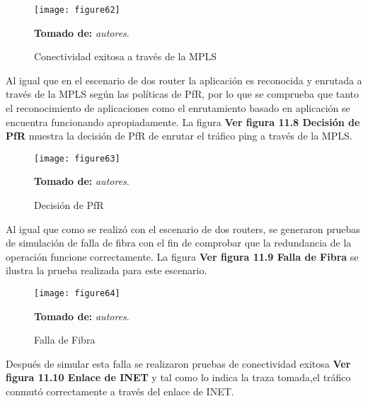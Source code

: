 \begin{figure}[htbp]
  \centering
    {\texttt{[image: figure62]}}%
  \caption{\footnotesize{Conectividad exitosa a través de la MPLS}}
 \footnotesize{ \textbf{Tomado de:} \textit{autores}.}
  \label{fig:fig2subfig}
\end{figure}

Al igual que en el escenario de dos router la aplicación es reconocida y enrutada a través de la MPLS según las políticas de PfR, por lo que se comprueba que tanto el reconocimiento de aplicaciones como el enrutamiento basado en aplicación se encuentra funcionando apropiadamente. La figura \textbf{Ver figura 11.8 Decisión de PfR} muestra la decisión de PfR de enrutar el tráfico ping a través de la MPLS.

\begin{figure}[htbp]
  \centering
    {\texttt{[image: figure63]}}%
  \caption{\footnotesize{Decisión de PfR}}
  \footnotesize{\textbf{Tomado de:} \textit{autores}.}
  \label{fig:fig2subfig}
\end{figure}

Al igual que como se realizó con el escenario de dos routers, se generaron pruebas de simulación de falla de fibra con el fin de comprobar que la redundancia de la operación funcione correctamente. La figura  \textbf{Ver figura 11.9 Falla de Fibra} se ilustra la prueba realizada para este escenario.

\begin{figure}[htbp]
  \centering
    {\texttt{[image: figure64]}}%
  \caption{\footnotesize{Falla de Fibra }}
  \footnotesize{\textbf{Tomado de:} \textit{autores}.}
  \label{fig:fig2subfig}
\end{figure}

Después de simular esta falla se realizaron pruebas de conectividad exitosa \textbf{Ver figura 11.10 Enlace de INET}  y tal como lo indica la traza tomada,el tráfico conmutó correctamente a través del enlace de INET.


